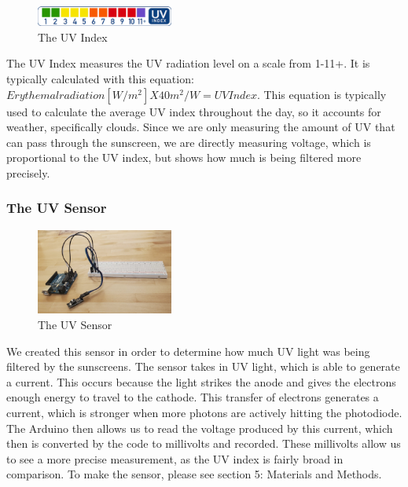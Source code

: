 \documentclass{article}
\begin{document}
\begin{figure}
  \centering
  \caption{The UV Index \cite{us_epa_uv_2015}}
  \includegraphics[width=0.4\textwidth]{UVIndex.png}
\end{figure}
The UV Index measures the UV radiation level on a scale from 1-11+. It is typically calculated with this equation: $Erythemal radiation [W/m^2] X 40m^2/W = UV Index$. This equation is typically used to calculate the average UV index throughout the day, so it accounts for weather, specifically clouds. Since we are only measuring the amount of UV that can pass through the sunscreen, we are directly measuring voltage, which is proportional to the UV index, but shows how much is being filtered more precisely.

\subsubsection{The UV Sensor}
\begin{figure}
  \centering
  \caption{The UV Sensor}
  \includegraphics[width=0.4\textwidth]{UVSensor.jpg}
\end{figure}
We created this sensor in order to determine how much UV light was being filtered by the sunscreens. The sensor takes in UV light, which is able to generate a current. This occurs because the light strikes the anode and gives the electrons enough energy to travel to the cathode. This transfer of electrons generates a current, which is stronger when more photons are actively hitting the photodiode. The Arduino then allows us to read the voltage produced by this current, which then is converted by the code to millivolts and recorded. These millivolts allow us to see a more precise measurement, as the UV index is fairly broad in comparison. To make the sensor, please see section 5: Materials and Methods. 
\end{document}
